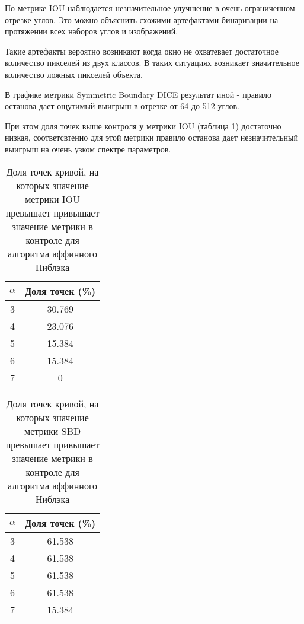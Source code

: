 По метрике IOU наблюдается незначительное улучшение в очень ограниченном отрезке углов. Это можно объяснить схожими артефактами бинаризации на протяжении всех наборов углов и изображений. 

Такие артефакты вероятно возникают когда окно не охватевает достаточное количество пикселей из двух классов. В таких ситуациях возникает значительное количество ложных пикселей объекта. 

В графике метрики Symmetric Boundary DICE результат иной - правило останова дает ощутимый выигрыш в отрезке от 64 до 512 углов. 

При этом доля точек выше контроля у метрики IOU (таблица \ref*{tab:niblackiou}) достаточно низкая, соответсвтенно для этой метрики правило останова дает незначительный выигрыш на очень узком спектре параметров.



\begin{table}[H]
\centering
\caption{Доля точек кривой, на которых значение метрики IOU превышает привышает значение метрики в  контроле для алгоритма аффинного Ниблэка}
\label{tab:niblackiou}
\begin{tabular}{|c|c|}
\hline
\(\alpha\) & Доля точек (\%) \\
\hline
3 & 30.769 \\
4 & 23.076 \\
5 & 15.384 \\
6 & 15.384 \\
7 &  0 \\
\hline
\end{tabular}
\end{table}

\begin{table}[H]
\centering
\caption{Доля точек кривой, на которых значение метрики SBD превышает привышает значение метрики в  контроле для алгоритма аффинного Ниблэка}
\label{tab:niblacksbd}
\begin{tabular}{|c|c|}
\hline
\(\alpha\) & Доля точек (\%) \\
\hline
3 & 61.538 \\
4 & 61.538 \\
5 & 61.538 \\
6 & 61.538 \\
7 & 15.384 \\
\hline
\end{tabular}
\end{table}

